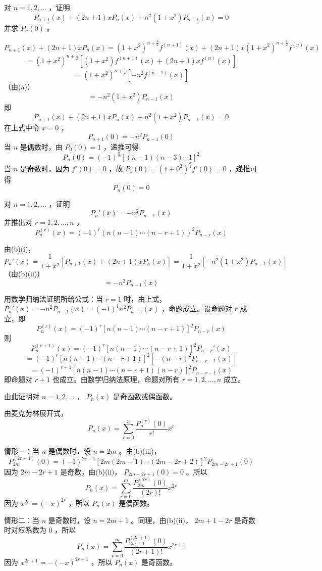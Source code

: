 \begin{questions}
\begin{parts}
\begin{subparts}
\subpart 对 $n=1,2,\ldots$ ，证明
\[
P_{n+1}(x)+(2n+1)xP_n(x)+n^2(1+x^2)P_{n-1}(x)=0
\]
并求 $P_n(0)$ 。

\begin{solution}
\[
P_{n+1}(x)+(2n+1)xP_n(x)=(1+x^2)^{n+\frac{3}{2}}f^{(n+1)}(x)+(2n+1)x(1+x^2)^{n+\frac{1}{2}}f^{(n)}(x)
\]
\[
=(1+x^2)^{n+\frac{1}{2}}\left[(1+x^2)f^{(n+1)}(x)+(2n+1)xf^{(n)}(x)\right]
\]
\[
=(1+x^2)^{n+\frac{1}{2}}\left[-n^2f^{(n-1)}(x)\right]
\]
（由(a)）
\[
=-n^2(1+x^2)P_{n-1}(x)
\]
即
\[
P_{n+1}(x)+(2n+1)xP_n(x)+n^2(1+x^2)P_{n-1}(x)=0
\]
在上式中令 $x=0$ ，
\[
P_{n+1}(0)=-n^2P_{n-1}(0)
\]
当 $n$ 是偶数时，由 $P_0(0)=1$ ，递推可得
\[
P_n(0)=(-1)^{\frac{n}{2}}\left[(n-1)(n-3)\cdots1\right]^2
\]
当 $n$ 是奇数时，因为 $f'(0)=0$ ，故 $P_1(0)=(1+0^2)^{\frac{3}{2}}f'(0)=0$ ，递推可得
\[
P_n(0)=0
\]
\end{solution}

\subpart 对 $n=1,2,\ldots$ ，证明
\[
P_n'(x)=-n^2P_{n-1}(x)
\]
并推出对 $r=1,2,\ldots,n$ ，
\[
P_n^{(r)}(x)=(-1)^r\left(n(n-1)\cdots(n-r+1)\right)^2P_{n-r}(x)
\]

\begin{solution}
由(b)(i)，
\[
P_n'(x)=\frac{1}{1+x^2}\left[P_{n+1}(x)+(2n+1)xP_n(x)\right]=\frac{1}{1+x^2}\left[-n^2(1+x^2)P_{n-1}(x)\right]
\]
（由(b)(ii)）
\[
=-n^2P_{n-1}(x)
\]

用数学归纳法证明所给公式：当 $r=1$ 时，由上式， $P_n'(x)=-n^2P_{n-1}(x)=(-1)^1n^2P_{n-1}(x)$ ，命题成立。设命题对 $r$ 成立，即
\[
P_n^{(r)}(x)=(-1)^r\left[n(n-1)\cdots(n-r+1)\right]^2P_{n-r}(x)
\]
则
\[
P_n^{(r+1)}(x)=(-1)^r\left[n(n-1)\cdots(n-r+1)\right]^2P_{n-r}'(x)
\]
\[
=(-1)^r\left[n(n-1)\cdots(n-r+1)\right]^2\left[-(n-r)^2P_{n-r-1}(x)\right]
\]
\[
=(-1)^{r+1}\left[n(n-1)\cdots(n-r+1)(n-r)\right]^2P_{n-r-1}(x)
\]
即命题对 $r+1$ 也成立。由数学归纳法原理，命题对所有 $r=1,2,\ldots,n$ 成立。
\end{solution}

\subpart 由此证明对 $n=1,2,\ldots$ ， $P_n(x)$ 是奇函数或偶函数。

\begin{solution}
由麦克劳林展开式，
\[
P_n(x)=\sum_{r=0}^n\frac{P_n^{(r)}(0)}{r!}x^r
\]

情形一：当 $n$ 是偶数时，设 $n=2m$ 。由(b)(iii)，
\[
P_{2m}^{(2r-1)}(0)=(-1)^{2r-1}\left[2m(2m-1)\cdots(2m-2r+2)\right]^2P_{2m-2r+1}(0)
\]
因为 $2m-2r+1$ 是奇数，由(b)(ii)， $P_{2m-2r+1}(0)=0$ 。所以
\[
P_n(x)=\sum_{r=0}^m\frac{P_{2m}^{(2r)}(0)}{(2r)!}x^{2r}
\]
因为 $x^{2r}=(-x)^{2r}$ ，所以 $P_n(x)$ 是偶函数。

情形二：当 $n$ 是奇数时，设 $n=2m+1$ 。同理，由(b)(ii)， $2m+1-2r$ 是奇数时对应系数为 $0$ ，所以
\[
P_n(x)=\sum_{r=0}^m\frac{P_{2m+1}^{(2r+1)}(0)}{(2r+1)!}x^{2r+1}
\]
因为 $x^{2r+1}=-(-x)^{2r+1}$ ，所以 $P_n(x)$ 是奇函数。


\end{solution}
\end{subparts}
\end{parts}
\end{questions}
